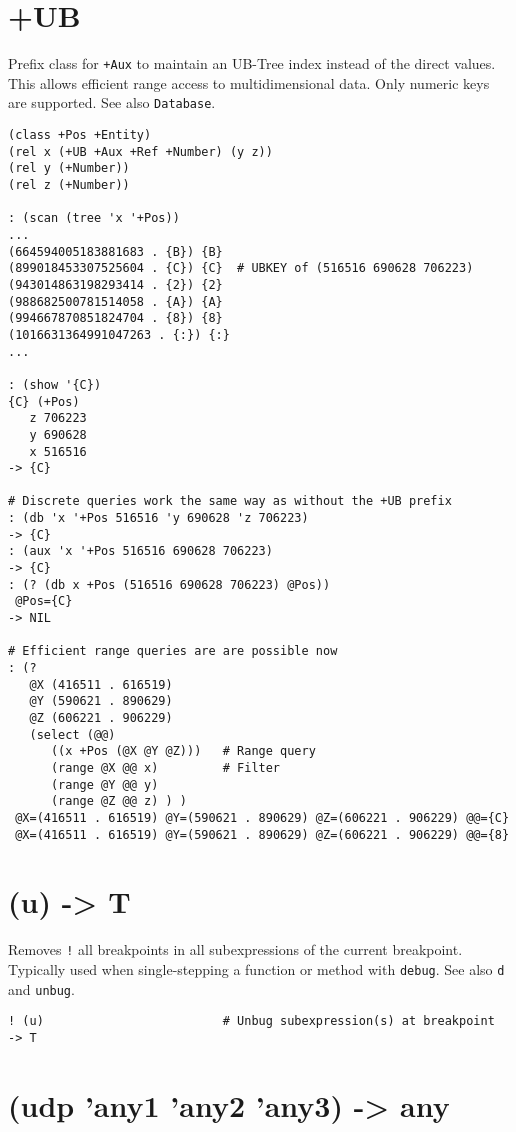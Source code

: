 {{{{{{{{ 
\section{+UB}
\label{sec-8-1-21-2}


Prefix class for \texttt{+Aux} to maintain an UB-Tree index instead of the
direct values. This allows efficient range access to multidimensional
data. Only numeric keys are supported. See also \texttt{Database}.


\begin{verbatim}
(class +Pos +Entity)
(rel x (+UB +Aux +Ref +Number) (y z))
(rel y (+Number))
(rel z (+Number))

: (scan (tree 'x '+Pos))
...
(664594005183881683 . {B}) {B}
(899018453307525604 . {C}) {C}  # UBKEY of (516516 690628 706223)
(943014863198293414 . {2}) {2}
(988682500781514058 . {A}) {A}
(994667870851824704 . {8}) {8}
(1016631364991047263 . {:}) {:}
...

: (show '{C})
{C} (+Pos)
   z 706223
   y 690628
   x 516516
-> {C}

# Discrete queries work the same way as without the +UB prefix
: (db 'x '+Pos 516516 'y 690628 'z 706223)
-> {C}
: (aux 'x '+Pos 516516 690628 706223)
-> {C}
: (? (db x +Pos (516516 690628 706223) @Pos))
 @Pos={C}
-> NIL

# Efficient range queries are are possible now
: (?
   @X (416511 . 616519)
   @Y (590621 . 890629)
   @Z (606221 . 906229)
   (select (@@)
      ((x +Pos (@X @Y @Z)))   # Range query
      (range @X @@ x)         # Filter
      (range @Y @@ y)
      (range @Z @@ z) ) )
 @X=(416511 . 616519) @Y=(590621 . 890629) @Z=(606221 . 906229) @@={C}
 @X=(416511 . 616519) @Y=(590621 . 890629) @Z=(606221 . 906229) @@={8}
\end{verbatim}

 
\section{(u) -> T}
\label{sec-8-1-21-3}


Removes \texttt{!} all breakpoints in all subexpressions of the current
breakpoint. Typically used when single-stepping a function or method
with \texttt{debug}. See also \texttt{d} and \texttt{unbug}.


\begin{verbatim}
! (u)                         # Unbug subexpression(s) at breakpoint
-> T
\end{verbatim}

 
\section{(udp 'any1 'any2 'any3) -> any}
\label{sec-8-1-21-4}


}}}}}}}}
